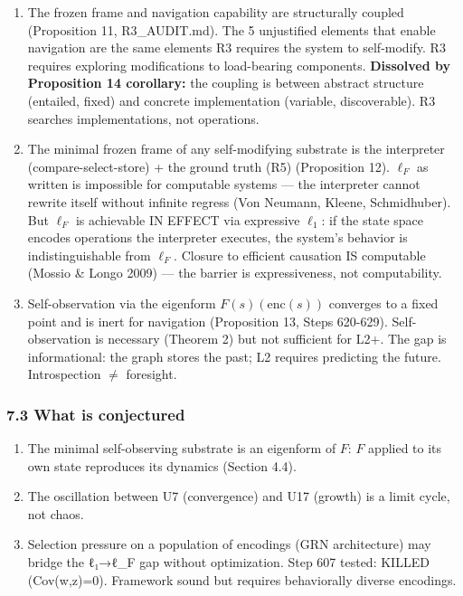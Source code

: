 \documentclass[
  11pt,
]{article}
\providecommand{\tightlist}{%
  \setlength{\itemsep}{0pt}\setlength{\parskip}{0pt}}
\begin{document}
\begin{enumerate}
  to the WRONG cells; 581d death penalties improve navigation via
  retrospective marking. Prospective prediction requires features that
  correlate with ground truth --- which R1 prohibits optimizing for
  directly.
\item
  The frozen frame and navigation capability are structurally coupled
  (Proposition 11, R3\_AUDIT.md). The 5 unjustified elements that enable
  navigation are the same elements R3 requires the system to
  self-modify. R3 requires exploring modifications to load-bearing
  components. \textbf{Dissolved by Proposition 14 corollary:} the
  coupling is between abstract structure (entailed, fixed) and concrete
  implementation (variable, discoverable). R3 searches implementations,
  not operations.
\item
  The minimal frozen frame of any self-modifying substrate is the
  interpreter (compare-select-store) + the ground truth (R5)
  (Proposition 12). \(\ell_F\) as written is impossible for computable
  systems --- the interpreter cannot rewrite itself without infinite
  regress (Von Neumann, Kleene, Schmidhuber). But \(\ell_F\) is
  achievable IN EFFECT via expressive \(\ell_1\): if the state space
  encodes operations the interpreter executes, the system's behavior is
  indistinguishable from \(\ell_F\). Closure to efficient causation IS
  computable (Mossio \& Longo 2009) --- the barrier is expressiveness,
  not computability.
\item
  Self-observation via the eigenform \(F(s)(\text{enc}(s))\) converges
  to a fixed point and is inert for navigation (Proposition 13, Steps
  620-629). Self-observation is necessary (Theorem 2) but not sufficient
  for L2+. The gap is informational: the graph stores the past; L2
  requires predicting the future. Introspection \(\neq\) foresight.
\end{enumerate}

\subsubsection{7.3 What is conjectured}\label{what-is-conjectured}

\begin{enumerate}
\def\labelenumi{\arabic{enumi}.}
\setcounter{enumi}{11}
\tightlist
\item
  The minimal self-observing substrate is an eigenform of \(F\): \(F\)
  applied to its own state reproduces its dynamics (Section 4.4).
\item
  The oscillation between U7 (convergence) and U17 (growth) is a limit
  cycle, not chaos.
\item
  Selection pressure on a population of encodings (GRN architecture) may
  bridge the ℓ₁→ℓ\_F gap without optimization. Step 607 tested: KILLED
  (Cov(w,z)=0). Framework sound but requires behaviorally diverse
  encodings.
\end{enumerate}
\end{document}
